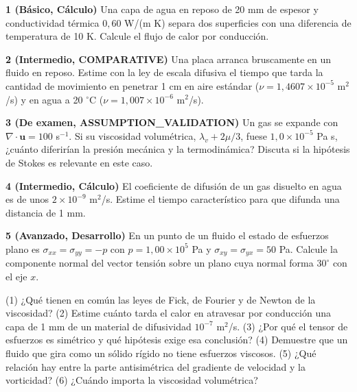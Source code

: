 \documentclass[10pt,openany]{book}
\begin{document}
\begin{tcolorbox}[title={Ejercicios propuestos}, studiumworked, breakable]

\noindent\textbf{1 (Básico, Cálculo)}
Una capa de agua en reposo de 20 mm de espesor y conductividad térmica \(0{,}60\) W/(m K) separa dos superficies con una diferencia de temperatura de 10 K. Calcule el flujo de calor por conducción.

\noindent\textbf{2 (Intermedio, COMPARATIVE)}
Una placa arranca bruscamente en un fluido en reposo. Estime con la ley de escala difusiva el tiempo que tarda la cantidad de movimiento en penetrar 1 cm en aire estándar (\(\nu = 1{,}4607\times 10^{-5}\) m\(^2\)/s) y en agua a 20 \(^\circ\)C (\(\nu = 1{,}007\times 10^{-6}\) m\(^2\)/s).

\noindent\textbf{3 (De examen, ASSUMPTION\_VALIDATION)}
Un gas se expande con \(\nabla\cdot\mathbf{u} = 100\) s\(^{-1}\). Si su viscosidad volumétrica, \(\lambda_v + 2\mu/3\), fuese \(1{,}0\times 10^{-5}\) Pa s, ¿cuánto diferirían la presión mecánica y la termodinámica? Discuta si la hipótesis de Stokes es relevante en este caso.

\noindent\textbf{4 (Intermedio, Cálculo)}
El coeficiente de difusión de un gas disuelto en agua es de unos \(2\times 10^{-9}\) m\(^2\)/s. Estime el tiempo característico para que difunda una distancia de 1 mm.

\noindent\textbf{5 (Avanzado, Desarrollo)}
En un punto de un fluido el estado de esfuerzos plano es \(\sigma_{xx} = \sigma_{yy} = -p\) con \(p = 1{,}00\times 10^{5}\) Pa y \(\sigma_{xy} = \sigma_{yx} = 50\) Pa. Calcule la componente normal del vector tensión sobre un plano cuya normal forma \(30^\circ\) con el eje \(x\).
\end{tcolorbox}

\begin{tcolorbox}[title={Autoevaluación}, studiumcheck, breakable]

(1) ¿Qué tienen en común las leyes de Fick, de Fourier y de Newton de la viscosidad? (2) Estime cuánto tarda el calor en atravesar por conducción una capa de 1 mm de un material de difusividad \(10^{-7}\) m\(^2\)/s. (3) ¿Por qué el tensor de esfuerzos es simétrico y qué hipótesis exige esa conclusión? (4) Demuestre que un fluido que gira como un sólido rígido no tiene esfuerzos viscosos. (5) ¿Qué relación hay entre la parte antisimétrica del gradiente de velocidad y la vorticidad? (6) ¿Cuándo importa la viscosidad volumétrica?
\end{tcolorbox}
\studiumchaptercheck
\end{document}
